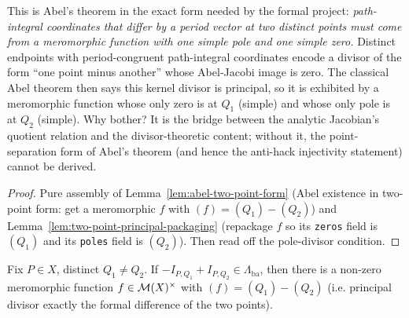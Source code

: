 \begin{layman}
This is Abel's theorem in the exact form needed by the formal
project: \emph{path-integral coordinates that differ by a period
vector at two distinct points must come from a meromorphic function
with one simple pole and one simple zero.} Distinct endpoints with
period-congruent path-integral coordinates encode a divisor of the
form ``one point minus another'' whose Abel-Jacobi image is zero.
The classical Abel theorem then says this kernel divisor is principal,
so it is exhibited by a meromorphic function whose only zero is at
\(Q_1\) (simple) and whose only pole is at \(Q_2\) (simple). Why
bother? It is the bridge between the analytic Jacobian's quotient
relation and the divisor-theoretic content; without it, the
point-separation form of Abel's theorem (and hence the anti-hack
injectivity statement) cannot be derived.
\end{layman}

\begin{proof}\leanok
Pure assembly of Lemma~\ref{lem:abel-two-point-form}
(Abel existence in two-point form: get a meromorphic \(f\) with
\((f) = (Q_1) - (Q_2)\)) and
Lemma~\ref{lem:two-point-principal-packaging}
(repackage \(f\) so its \texttt{zeros} field is \((Q_1)\) and its
\texttt{poles} field is \((Q_2)\)). Then read off the pole-divisor
condition.
\end{proof}


\begin{lemma}
\label{lem:abel-two-point-form}
Fix \(P\in X\), distinct \(Q_1\neq Q_2\). If
\(-I_{P,Q_1} + I_{P,Q_2} \in \Lambda_{\mathrm{ba}}\), then there is a
non-zero meromorphic function \(f\in\mathcal{M}(X)^\times\) with
\((f) = (Q_1) - (Q_2)\) (i.e. principal divisor exactly the formal
difference of the two points).
\leanok
\end{lemma}

